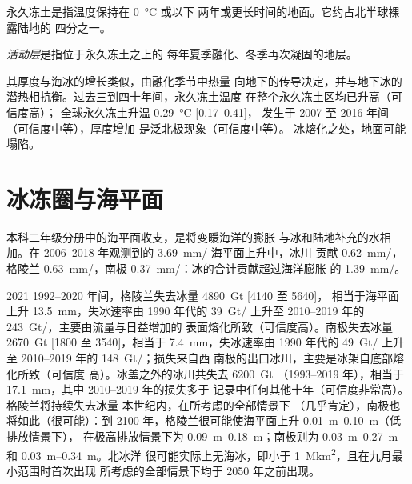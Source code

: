 永久冻土是指温度保持在 \qty{0}{\celsius} 或以下
两年或更长时间的地面。它约占北半球裸露陆地的
四分之一。

\begin{definition}[活动层]\label{def:b3:glaciology:permafrost}
\emph{活动层}是指位于永久冻土之上的
每年夏季融化、冬季再次凝固的地层。
\end{definition}

其厚度与海冰的增长类似，由融化季节中热量
向地下的传导决定，并与地下冰的
潜热相抗衡。过去三到四十年间，永久冻土温度
在整个永久冻土区均已升高（可信度高）；
全球永久冻土升温 \qty{0.29}{\celsius} [\numrange{0.17}{0.41}]，
发生于 2007 至 2016 年间（可信度中等），厚度增加
是泛北极现象（可信度中等）。
冰熔化之处，地面可能塌陷。

\section{冰冻圈与海平面}\label{sec:b3:glaciology:sea-level}

本科二年级分册中的海平面收支，是将变暖海洋的膨胀
与冰和陆地补充的水相加。在
2006--2018 年观测到的 \qty{3.69}{mm/} 海平面上升中，冰川
贡献 \qty{0.62}{mm/}，格陵兰 \qty{0.63}{mm/}，南极
\qty{0.37}{mm/}：冰的合计贡献超过海洋膨胀
的 \qty{1.39}{mm/}。

\begin{dated}{2021}
1992--2020 年间，格陵兰失去冰量 \qty{4890}{Gt} [4140 至 5640]，
相当于海平面上升 \qty{13.5}{mm}，失冰速率由 1990 年代的 \qty{39}{Gt/}
上升至 2010--2019 年的 \qty{243}{Gt/}，主要由流量与日益增加的
表面熔化所致（可信度高）。南极失去冰量 \qty{2670}{Gt}
[1800 至 3540]，相当于 \qty{7.4}{mm}，失冰速率由 1990 年代的 \qty{49}{Gt/}
上升至 2010--2019 年的 \qty{148}{Gt/}；损失来自西
南极的出口冰川，主要是冰架自底部熔化所致（可信度
高）。冰盖之外的冰川共失去 \qty{6200}{Gt}
（1993--2019 年），相当于 \qty{17.1}{mm}，其中 2010--2019 年的损失多于
记录中任何其他十年（可信度非常高）。格陵兰将持续失去冰量
本世纪内，在所考虑的全部情景下
（几乎肯定），南极也将如此（很可能）：到 2100 年，格陵兰很可能使海平面上升
\qtyrange{0.01}{0.10}{m}（低排放情景下），
在极高排放情景下为 \qtyrange{0.09}{0.18}{m}；南极则为
\qtyrange{0.03}{0.27}{m} 和 \qtyrange{0.03}{0.34}{m}。北冰洋
很可能实际上无海冰，即小于
\qty{1}{\mega km^2}，且在九月最小范围时首次出现
所考虑的全部情景下均于 2050 年之前出现。
\end{dated}

